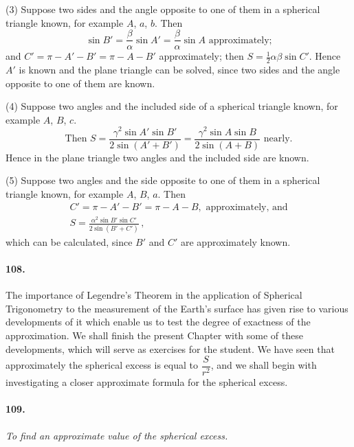 \documentclass{book}[2004/02/16]
\begin{document}
\begin{mainmatter}
\begin{spacing}{1.3}
(3) Suppose two sides and the angle opposite to one of them
in a spherical triangle known, for example $A$, $a$, $b$. Then
\[
\sin B' = \frac{\beta}{\alpha}\sin A' = \frac{\beta}{\alpha}\sin A \text{ approximately;}
\]
and $C'=\pi-A'-B' = \pi-A-B'$ approximately; then $S=\frac{1}{2}\alpha\beta\sin C'$.
Hence $A'$ is known and the plane triangle can be solved, since two
sides and the angle opposite to one of them are known.

(4) Suppose two angles and the included side of a spherical
triangle known, for example $A$, $B$, $c$.
\[
\text{Then } S=\frac{\gamma^2 \sin A' \sin B'}{2\sin(A'+B')}
= \frac{\gamma^2\sin A \sin B}{2\sin(A+B)} \text{ nearly.}
\]
Hence in the plane triangle two angles and the included side are
known.

(5) Suppose two angles and the side opposite to one of them
in a spherical triangle known, for example $A$, $B$, $a$. Then
\begin{gather*}
C'=\pi-A'-B'=\pi-A-B,\text{ approximately, and} \\[1ex]
S=\frac{\alpha^2\sin B' \sin C'}{2\sin(B'+C')}\,,
\end{gather*}
which can be calculated, since $B'$ and $C'$ are approximately
known.

\paragraph{108.} The importance of Legendre's Theorem in the application
of Spherical Trigonometry to the measurement of the Earth's
surface has given rise to various developments of it which enable
us to test the degree of exactness of the approximation. We shall
finish the present Chapter with some of these developments, which
will serve as exercises for the student. We have seen that approximately
the spherical excess is equal to $\dfrac{S}{r^2}$, and we shall
begin with investigating a closer approximate formula for the
spherical excess.

\paragraph{109.} \textit{To find an approximate value of the spherical excess.}


\end{spacing}
\end{mainmatter}
\end{document}
